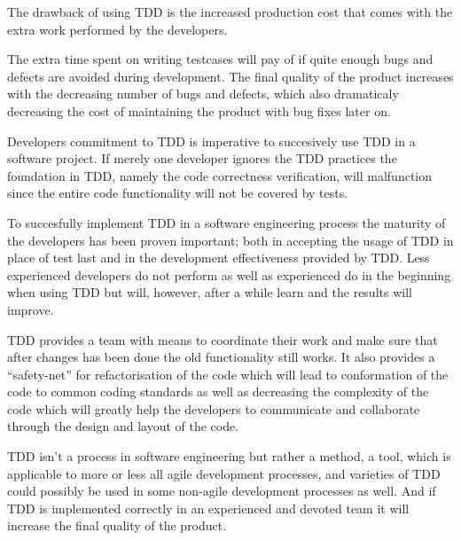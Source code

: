The drawback of using TDD is the increased production cost that comes with the extra work performed by the developers.

The extra time spent on writing testcases will pay of if quite enough bugs and defects are avoided during development. The final quality of the product increases with the decreasing number of bugs and defects, which also dramaticaly decreasing the cost of maintaining the product with bug fixes later on.

Developers commitment to TDD is imperative to succesively use TDD in a software project. If merely one developer ignores the TDD practices the foundation in TDD, namely the code correctness verification, will malfunction since the entire code functionality will not be covered by tests.

To succesfully implement TDD in a software engineering process the maturity of the developers has been proven important; both in accepting the usage of TDD in place of test last and in the development effectiveness provided by TDD.
Less experienced developers do not perform as well as experienced do in the beginning when using TDD but will, however, after a while learn and the results will improve.

TDD provides a team with means to coordinate their work and make sure that after changes has been done the old functionality still works. It also provides a ``safety-net'' for refactorisation of the code which will lead to conformation of the code to common coding standards as well as decreasing the complexity of the code which will  greatly help the developers to communicate and collaborate through the design and layout of the code.

TDD isn't a process in software engineering but rather a method, a tool, which is applicable to more or less all agile development processes, and varieties of TDD could possibly be used in some non-agile development processes as well. And if TDD is implemented correctly in an experienced and devoted team it will increase the final quality of the product.